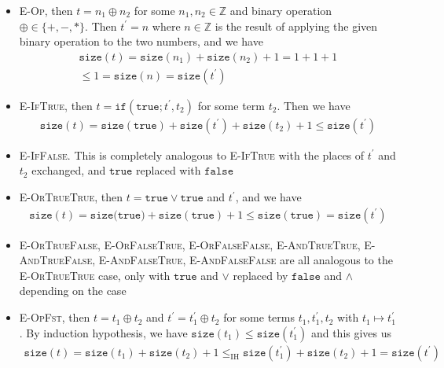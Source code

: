 \documentclass{article}
\begin{document}
\begin{itemize}
\item \textsc{E-Op}, then $t = n_1 \oplus n_2$ for some $n_1,n_2\in\mathbb{Z}$ and binary operation $\oplus\in\{+,-,*\}$. 
  Then $t^{\prime} = n$ where $n\in\mathbb{Z}$ is the result of applying the given binary operation to the two numbers, and we have 
  \begin{align*}
    \mathtt{size}(t) = \mathtt{size}(n_1) + \mathtt{size}(n_2) + 1 = 1 + 1 + 1 \\
    \leq 1  = \mathtt{size}(n) =\mathtt{size}(t^{\prime})
  \end{align*}
\item \textsc{E-IfTrue}, then $t =\mathtt{if}(\mathtt{true};t^{\prime},t_2)$ for some term $t_2$. Then we have 
  \begin{align*}
    \mathtt{size}(t) = \mathtt{size}(\mathtt{true}) + \mathtt{size}(t^{\prime}) + \mathtt{size}(t_2) + 1 \leq \mathtt{size}(t^{\prime})
  \end{align*}
\item \textsc{E-IfFalse}. This is completely analogous to \textsc{E-IfTrue} with the places of $t^{\prime}$ and $t_2$ exchanged, and $\mathtt{true}$ replaced with $\mathtt{false}$
\item \textsc{E-OrTrueTrue}, then $t = \mathtt{true} \vee \mathtt{true}$ and $t^{\prime}$, and we have 
  \begin{align*}
    \mathtt{size}(t) = \mathtt{size}(\mathtt{true)} + \mathtt{size}(\mathtt{true}) + 1 \leq \mathtt{size}(\mathtt{true}) = \mathtt{size}(t^{\prime})
  \end{align*}
\item \textsc{E-OrTrueFalse}, \textsc{E-OrFalseTrue}, \textsc{E-OrFalseFalse}, \textsc{E-AndTrueTrue}, \textsc{E-AndTrueFalse}, \textsc{E-AndFalseTrue}, \textsc{E-AndFalseFalse} are all analogous to the \textsc{E-OrTrueTrue} case, only with $\mathtt{true}$ and $\vee$ replaced by $\mathtt{false}$ and $\wedge$ depending on the case
\item \textsc{E-OpFst}, then $t=t_1 \oplus t_2$ and $t^{\prime} = t_1^{\prime}\oplus t_2$ for some terms $t_1,t_1^{\prime},t_2$ with $t_1\mapsto t_1^{\prime}$. By induction hypothesis, we have $\mathtt{size}(t_1)\leq \mathtt{size}(t_1^{\prime})$ and this gives us 
  \begin{align*}
    \mathtt{size}(t) = \mathtt{size}(t_1) + \mathtt{size}(t_2) + 1 \leq_{\text{IH}} \mathtt{size}(t_1^{\prime}) + \mathtt{size}(t_2) + 1 = \mathtt{size}(t^{\prime})
  \end{align*}

\end{itemize}
\end{document}
